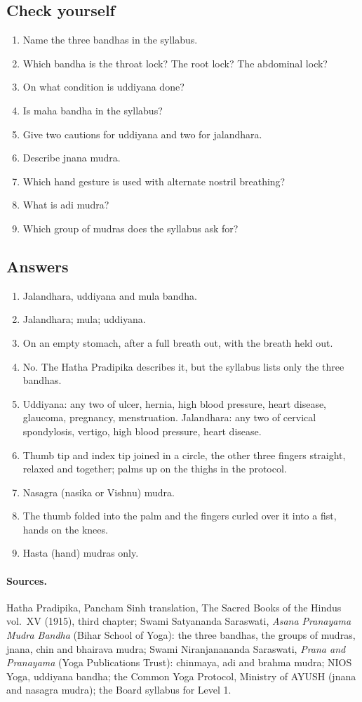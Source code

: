\subsection*{Check yourself}
\begin{enumerate}
\item Name the three bandhas in the syllabus.
\item Which bandha is the throat lock? The root lock? The abdominal lock?
\item On what condition is uddiyana done?
\item Is maha bandha in the syllabus?
\item Give two cautions for uddiyana and two for jalandhara.
\item Describe jnana mudra.
\item Which hand gesture is used with alternate nostril breathing?
\item What is adi mudra?
\item Which group of mudras does the syllabus ask for?
\end{enumerate}

\subsection*{Answers}
\begin{enumerate}
\item Jalandhara, uddiyana and mula bandha.
\item Jalandhara; mula; uddiyana.
\item On an empty stomach, after a full breath out, with the breath held out.
\item No. The Hatha Pradipika describes it, but the syllabus lists only the three bandhas.
\item Uddiyana: any two of ulcer, hernia, high blood pressure, heart disease, glaucoma, pregnancy, menstruation. Jalandhara: any two of cervical spondylosis, vertigo, high blood pressure, heart disease.
\item Thumb tip and index tip joined in a circle, the other three fingers straight, relaxed and together; palms up on the thighs in the protocol.
\item Nasagra (nasika or Vishnu) mudra.
\item The thumb folded into the palm and the fingers curled over it into a fist, hands on the knees.
\item Hasta (hand) mudras only.
\end{enumerate}

\paragraph{Sources.} Hatha Pradipika, Pancham Sinh translation, The Sacred Books of the Hindus vol.~XV (1915), third chapter; Swami Satyananda Saraswati, \emph{Asana Pranayama Mudra Bandha} (Bihar School of Yoga): the three bandhas, the groups of mudras, jnana, chin and bhairava mudra; Swami Niranjanananda Saraswati, \emph{Prana and Pranayama} (Yoga Publications Trust): chinmaya, adi and brahma mudra; NIOS Yoga, uddiyana bandha; the Common Yoga Protocol, Ministry of AYUSH (jnana and nasagra mudra); the Board syllabus for Level 1.
